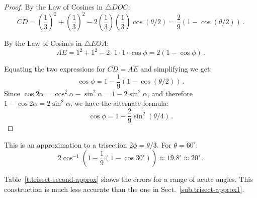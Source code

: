 \begin{proof} By the Law of Cosines in $\triangle DOC$:
\[
\overline{CD}= \left(\frac{1}{3}\right)^2+\left(\frac{1}{3}\right)^2-2\left(\frac{1}{3}\right)\left(\frac{1}{3}\right)\cos (\theta/2)=\frac{2}{9}(1-\cos(\theta/2))\,.
\]

By the Law of Cosines in $\triangle EOA$:
\[
\overline{AE} = 1^2+1^2-2\cdot 1\cdot 1\cdot \cos \phi=2(1-\cos \phi)\,.
\]

\newpage

Equating the two expressions for $\overline{CD}=\overline{AE}$ and simplifying we get:
\[
\cos \phi = 1 - \frac{1}{9}(1-\cos(\theta/2))\,.
\]
Since $\cos 2\alpha= \cos^2 \alpha-\sin^2\alpha=1-2\sin^2\alpha$, and therefore $1-\cos 2\alpha=2\sin^2\alpha$, we have the alternate formula:
\[
\cos \phi = 1 - \frac{2}{9}\sin^2(\theta/4)\,.
\]
\end{proof}

This is an approximation to a trisection $2\phi=\theta/3$. For $\theta=60^\circ$:
\[
2\cos^{-1}\left(1 - \frac{1}{9}(1-\cos 30^\circ)\right)\approx 19.8^\circ\approx 20^\circ\,.
\]

Table~\ref{t.trisect-second-approx} shows the errors for a range of acute angles. This construction is much less accurate than the one in Sect.~\ref{sub.trisect-approx1}.

